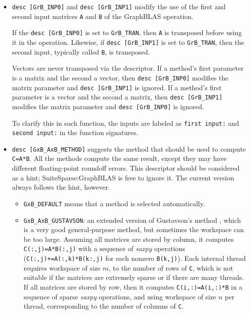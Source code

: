 \documentclass[12pt]{article}
\begin{document}
\begin{itemize}
\item \verb'desc [GrB_INP0]' and \verb'desc [GrB_INP1]' modify the use of the
    first and second input matrices \verb'A' and \verb'B' of the GraphBLAS
    operation.

    If the \verb'desc [GrB_INP0]' is set to \verb'GrB_TRAN', then \verb'A' is
    transposed before using it in the operation.  Likewise, if
    \verb'desc [GrB_INP1]' is set to \verb'GrB_TRAN', then the second input,
    typically called \verb'B', is transposed.

    Vectors are never transposed via the descriptor.  If a method's first
    parameter is a matrix and the second a vector, then \verb'desc [GrB_INP0]'
    modifies the matrix parameter and \verb'desc [GrB_INP1]' is ignored.  If a
    method's first parameter is a vector and the second a matrix, then
    \verb'desc [GrB_INP1]' modifies the matrix parameter and
    \verb'desc [GrB_INP0]' is ignored.

    To clarify this in each function, the inputs are labeled as
    \verb'first input:' and \verb'second input:' in the function signatures.

\item \verb'desc [GxB_AxB_METHOD]' suggests the method that should be
    used to compute \verb'C=A*B'.  All the methods compute the same result,
    except they may have different floating-point roundoff errors.  This
    descriptor should be considered as a hint; SuiteSparse:GraphBLAS is
    free to ignore it.  The current version always follows the hint, however.

    \begin{itemize}

    \item \verb'GxB_DEFAULT' means that a method is selected automatically.

    \item \verb'GxB_AxB_GUSTAVSON':  an extended version of Gustavson's method
    \cite{Gustavson78}, which is a very good general-purpose method, but
    sometimes the workspace can be too large.  Assuming all matrices are stored
    by column, it computes \verb'C(:,j)=A*B(:,j)' with a sequence of {\em
    saxpy} operations (\verb'C(:,j)+=A(:,k)*B(k:,j)' for each nonzero
    \verb'B(k,j)').  Each internal thread requires workspace of size $m$, to
    the number of rows of \verb'C', which is not suitable if the matrices are
    extremely sparse or if there are many threads.  If all matrices are stored
    by row, then it computes \verb'C(i,:)=A(i,:)*B' in a sequence of sparse
    {\em saxpy} operations, and using workspace of size $n$ per thread,
    corresponding to the number of columns of \verb'C'.


\end{itemize}
\end{itemize}
\end{document}
